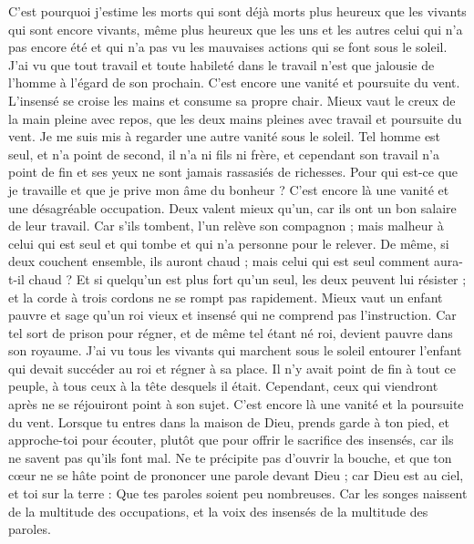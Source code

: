 \begin{multicols}{2}
C'est pourquoi j'estime les morts qui sont déjà morts plus heureux que les vivants qui sont encore vivants,
même plus heureux que les uns et les autres celui qui n’a pas encore été et qui n'a pas vu les mauvaises actions qui se font sous le soleil.
J'ai vu que tout travail et toute habileté dans le travail n’est que jalousie de l’homme à l’égard de son prochain. C’est encore une vanité et poursuite du vent.
L’insensé se croise les mains et consume sa propre chair.
Mieux vaut le creux de la main pleine avec repos, que les deux mains pleines avec travail et poursuite du vent.
Je me suis mis à regarder une autre vanité sous le soleil.
Tel homme est seul, et n'a point de second, il n'a ni fils ni frère, et cependant son travail n’a point de fin et ses yeux ne sont jamais rassasiés de richesses. Pour qui est-ce que je travaille et que je prive mon âme du bonheur ? C’est encore là une vanité et une désagréable occupation.
Deux valent mieux qu'un, car ils ont un bon salaire de leur travail.
Car s’ils tombent, l'un relève son compagnon ; mais malheur à celui qui est seul et qui tombe et qui n'a personne pour le relever.
De même, si deux couchent ensemble, ils auront chaud ; mais celui qui est seul comment aura-t-il chaud ?
Et si quelqu'un est plus fort qu’un seul, les deux peuvent lui résister ; et la corde à trois cordons ne se rompt pas rapidement.
Mieux vaut un enfant pauvre et sage qu'un roi vieux et insensé qui ne comprend pas l’instruction.
Car tel sort de prison pour régner, et de même tel étant né roi, devient pauvre dans son royaume.
J'ai vu tous les vivants qui marchent sous le soleil entourer l’enfant qui devait succéder au roi et régner à sa place.
Il n’y avait point de fin à tout ce peuple, à tous ceux à la tête desquels il était. Cependant, ceux qui viendront après ne se réjouiront point à son sujet. C’est encore là une vanité et la poursuite du vent.
Lorsque tu entres dans la maison de Dieu, prends garde à ton pied, et approche-toi pour écouter, plutôt que pour offrir le sacrifice des insensés, car ils ne savent pas qu'ils font mal.
\VerseOne{}Ne te précipite pas d’ouvrir la bouche, et que ton cœur ne se hâte point de prononcer une parole devant Dieu ; car Dieu est au ciel, et toi sur la terre : Que tes paroles soient peu nombreuses.
Car les songes naissent de la multitude des occupations, et la voix des insensés de la multitude des paroles.

\end{multicols}
